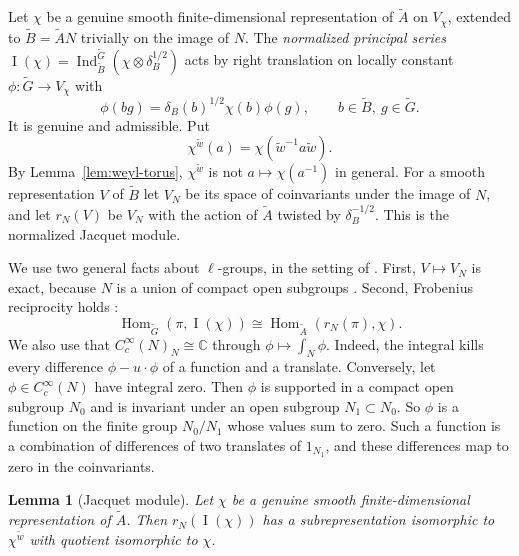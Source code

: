 \documentclass[12pt,letterpaper]{article}
\numberwithin{equation}{section}
\theoremstyle{plain}
\newtheorem{lemma}[theorem]{Lemma}
\theoremstyle{definition}
\theoremstyle{remark}
\newcommand{\Gt}{\widetilde G}
\newcommand{\At}{\widetilde A}
\newcommand{\Bt}{\widetilde B}
\newcommand{\wt}{\tilde w}
\newcommand{\Cc}{\mathbb C}
\DeclareMathOperator{\PI}{I}
\DeclareMathOperator{\Ind}{Ind}
\DeclareMathOperator{\Hom}{Hom}
\begin{document}
Let $\chi$ be a genuine smooth finite-dimensional representation of
$\At$ on $V_\chi$, extended to $\Bt=\At N$ trivially on the image of
$N$. The \emph{normalized principal series}
$\PI(\chi)=\Ind_{\Bt}^{\Gt}(\chi\otimes\delta_B^{1/2})$ acts by right
translation on locally constant $\phi:\Gt\to V_\chi$ with
\begin{equation}\label{eq:induction}
\phi(bg)=\delta_B(b)^{1/2}\chi(b)\phi(g),\qquad b\in\Bt,\ g\in\Gt .
\end{equation}
It is genuine and admissible. Put
\begin{equation}\label{eq:weyl-action}
\chi^{\wt}(a)=\chi(\wt^{-1}a\wt).
\end{equation}
By Lemma~\ref{lem:weyl-torus}, $\chi^{\wt}$ is not
$a\mapsto\chi(a^{-1})$ in general. For a smooth representation $V$ of
$\Bt$ let $V_N$ be its space of coinvariants under the image of $N$, and
let $r_N(V)$ be $V_N$ with the action of $\At$ twisted by
$\delta_B^{-1/2}$. This is the normalized Jacquet module.

We use two general facts about $\ell$-groups, in the setting of
\cite[\S1.8]{BZ77}. First, $V\mapsto V_N$ is exact, because $N$ is a
union of compact open subgroups \cite[Proposition~1.9(a)]{BZ77}.
Second, Frobenius reciprocity holds
\cite[Proposition~1.9(b)]{BZ77}:
\[
\Hom_{\Gt}(\pi,\PI(\chi))\cong\Hom_{\At}(r_N(\pi),\chi).
\]
We also use that $C_c^\infty(N)_N\cong\Cc$ through
$\phi\mapsto\int_N\phi$. Indeed, the integral kills every difference
$\phi-u\cdot\phi$ of a function and a translate. Conversely, let
$\phi\in C_c^\infty(N)$ have integral zero. Then $\phi$ is supported in
a compact open subgroup $N_0$ and is invariant under an open subgroup
$N_1\subset N_0$. So $\phi$ is a function on the finite group $N_0/N_1$
whose values sum to zero. Such a function is a combination of
differences of two translates of $1_{N_1}$, and these differences map
to zero in the coinvariants.

\begin{lemma}[Jacquet module]\label{lem:jacquet}
Let $\chi$ be a genuine smooth finite-dimensional representation of
$\At$. Then $r_N(\PI(\chi))$ has a subrepresentation isomorphic to
$\chi^{\wt}$ with quotient isomorphic to $\chi$.
\end{lemma}
\end{document}
